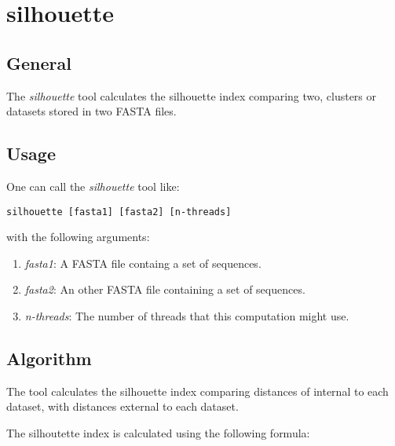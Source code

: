 \section{silhouette}

\subsection{General}

The \emph{silhouette} tool calculates the silhouette index comparing two,
clusters or datasets stored in two FASTA files.

\subsection{Usage}

One can call the \emph{silhouette} tool like:
\begin{lstlisting}
silhouette [fasta1] [fasta2] [n-threads]
\end{lstlisting}
with the following arguments:
\begin{enumerate}
\item \emph{fasta1}: A FASTA file containg a set of sequences.
\item \emph{fasta2}: An other FASTA file containing a set of sequences.
\item \emph{n-threads}: The number of threads that this computation might use.
\end{enumerate}

\subsection{Algorithm}

The tool calculates the silhouette index comparing distances of
internal to each dataset, with distances external to each dataset.

The silhoutette index is calculated using the following formula:

